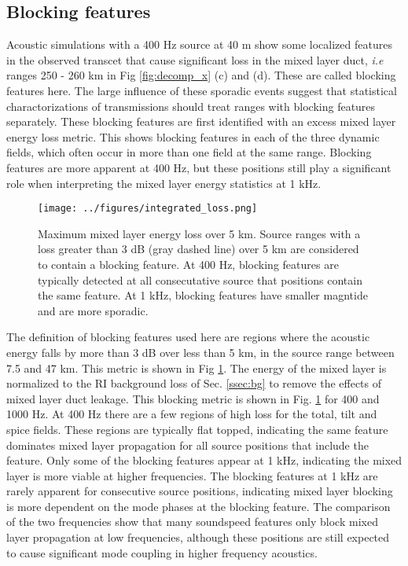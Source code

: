 \documentclass[preprint,NumberedRefs]{JASA}
\begin{document}
\subsection{Blocking features}
Acoustic simulations with a 400 Hz source at 40 m show some localized features in the observed transcet that cause significant loss in the mixed layer duct, \emph{i.e} ranges 250 - 260 km in Fig \ref{fig:decomp_x} (c) and (d). These are called blocking features here. The large influence of these sporadic events suggest that statistical charactorizations of transmissions should treat ranges with blocking features separately. These blocking features are first identified with an excess mixed layer energy loss metric. This shows blocking features in each of the three dynamic fields, which often occur in more than one field at the same range. Blocking features are more apparent at 400 Hz, but these positions still play a significant role when interpreting the mixed layer energy statistics at 1 kHz.

\begin{figure}
\texttt{[image: ../figures/integrated\_loss.png]}
    \caption{Maximum mixed layer energy loss over 5 km. Source ranges with a loss greater than 3 dB (gray dashed line) over 5 km are considered to contain a blocking feature. At 400 Hz, blocking features are typically detected at all consecutative source that positions contain the same feature. At 1 kHz, blocking features have smaller magntide and are more sporadic.}
    \label{fig:blocking}
\end{figure}

The definition of blocking features used here are regions where the acoustic energy falls by more than 3 dB over less than 5 km, in the source range between 7.5 and 47 km. This metric is shown in Fig \ref{fig:blocking}. The energy of the mixed layer is normalized to the RI background loss of Sec. \ref{ssec:bg} to remove the effects of mixed layer duct leakage. This blocking metric is shown in Fig. \ref{fig:blocking} for 400 and 1000 Hz. At 400 Hz there are a few regions of high loss for the total, tilt and spice fields. These regions are typically flat topped, indicating the same feature dominates mixed layer propagation for all source positions that include the feature. Only some of the blocking features appear at 1 kHz, indicating the mixed layer is more viable at higher frequencies. The blocking features at 1 kHz are rarely apparent for consecutive source positions, indicating mixed layer blocking is more dependent on the mode phases at the blocking feature. The comparison of the two frequencies show that many soundspeed features only block mixed layer propagation at low frequencies, although these positions are still expected to cause significant mode coupling in higher frequency acoustics.
\end{document}
